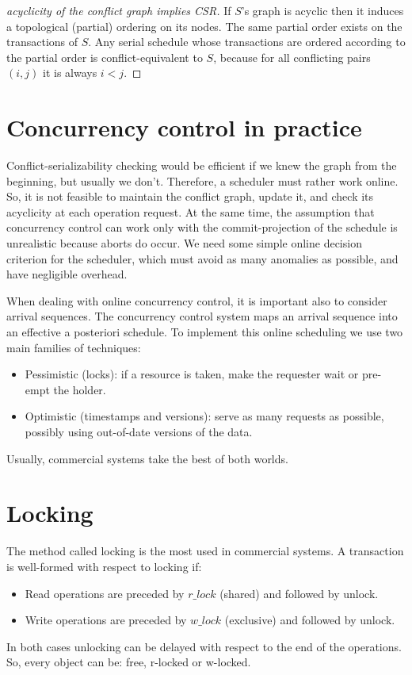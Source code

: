 \documentclass[12pt, a4paper]{report}
\begin{document}
    \begin{proof}[acyclicity of the conflict graph implies CSR]
        If $S$'s graph is acyclic then it induces a topological (partial) ordering on its nodes. The same partial order exists on the transactions of $S$. 
        Any serial schedule whose transactions are ordered according to the partial order is conflict-equivalent to $S$, because for all conflicting pairs $(i,j)$ it is always $i<j$. 
    \end{proof}
        
    \section{Concurrency control in practice}
    Conflict-serializability checking would be efficient if we knew the graph from the beginning, but usually we don't. Therefore, a scheduler must rather work online. 
    So, it is not feasible to maintain the conflict graph, update it, and check its acyclicity at each operation request. At the same time, the assumption that concurrency control 
    can work only with the commit-projection of the schedule is unrealistic because aborts do occur. We need some simple online decision criterion for the scheduler, which must 
    avoid as many anomalies as possible, and have negligible overhead. 
        
    When dealing with online concurrency control, it is important also to consider arrival sequences. The concurrency control system maps an arrival sequence into an effective a 
    posteriori schedule. To implement this online scheduling we use two main families of techniques:
    \begin{itemize}
        \item Pessimistic (locks): if a resource is taken, make the requester wait or pre-empt the holder.
        \item Optimistic (timestamps and versions): serve as many requests as possible, possibly using out-of-date versions of the data. 
    \end{itemize}
    Usually, commercial systems take the best of both worlds. 

    \section{Locking}
    The method called locking is the most used in commercial systems. A transaction is well-formed with respect to locking if: 
    \begin{itemize}
        \item Read operations are preceded by $r\_lock$ (shared) and followed by unlock. 
        \item Write operations are preceded by $w\_lock$ (exclusive) and followed by unlock. 
    \end{itemize}
    In both cases unlocking can be delayed with respect to the end of the operations. So, every object can be: free, r-locked or w-locked. 
\end{document}
